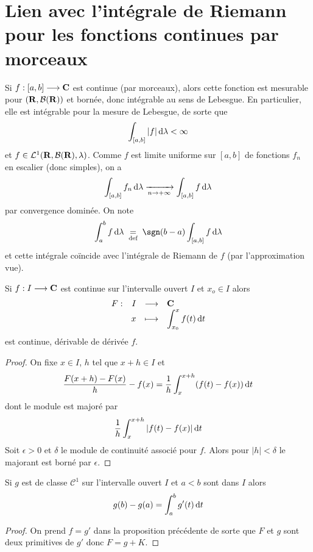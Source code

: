 \section{Lien avec l'intégrale de Riemann pour les fonctions continues par morceaux}

Si $f:[a, b] \longrightarrow \mathbf C$ est continue (par morceaux), alors cette fonction est mesurable pour $(\mathbf R, \mathcal  B(\mathbf R))$ et bornée, donc intégrable au sens de Lebesgue. En particulier, elle est intégrable pour la mesure de Lebesgue, de sorte que \[
\int_{[a, b]}|f|\mathop{}\!\mathrm d\lambda <\infty
\]
et $f \in  \mathcal  L^1(\mathbf R, \mathcal  B(\mathbf R), \lambda)$. Comme $f$ est limite uniforme sur  $[a, b]$ de fonctions  $f_n$ en escalier (donc simples), on a  \[
    \int_{[a, b]}f_n\mathop{}\!\mathrm d\lambda \xrightarrow[n\to+\infty]{} \int_{[a, b]}f\mathop{}\!\mathrm d\lambda
\] 
par convergence dominée. On note \[
    \int_a^bf\diff\lambda \defeq\sgn(b-a)\int_{[a, b]}f\diff\lambda
\] 
et cette intégrale coïncide avec l'intégrale de Riemann de $f$ (par l'approximation vue).

\begin{prop}
Si $f:I \longrightarrow  \mathbf C$ est continue sur l'intervalle ouvert $I$ et  $x_o \in  I$ alors \[
\begin{array}{rrcl}
    F:& I & \longrightarrow & \mathbf C \\
      & x & \longmapsto & \displaystyle \int_{x_0}^x f(t)\mathop{}\!\mathrm d t
\end{array}
\] 
est continue, dérivable de dérivée $f$.
\end{prop}

\begin{proof}
On fixe $x \in  I$, $h$ tel que  $x+h \in  I$ et \[
    \frac{F(x+h)-F(x)}{h}-f(x)=\frac{1}{h}\int_{x}^{x+h}(f(t)-f(x))\mathop{}\!\mathrm d t
\] 
dont le module est majoré par \[
    \frac{1}{h} \int_x^{x+h}|f(t)-f(x)|\mathop{}\!\mathrm d t
\]
Soit $\epsilon>0$ et $\delta$ le module de continuité associé pour  $f$. Alors pour  $|h|<\delta$ le majorant est borné par  $\epsilon$.
\end{proof}

\begin{cor}
    Si $g$ est de classe  $\mathcal  C^1$ sur l'intervalle ouvert $I$ et  $a<b$ sont dans  $I$ alors  \[
        g(b)-g(a)=\int_a^b g'(t)\mathop{}\!\mathrm d t
    \]
\end{cor}

\begin{proof}
On prend $f=g'$ dans la proposition précédente de sorte que $F$ et  $g$ sont deux primitives de  $g'$ donc  $F=g+K$.
\end{proof}

